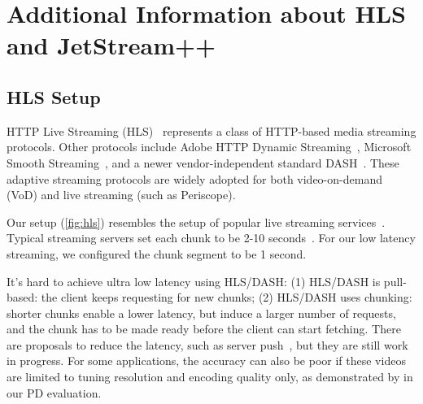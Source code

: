 


\section{Additional Information about HLS and JetStream++}
\label{sec:addit-inform-about}

\subsection{HLS Setup}
\label{appendix:hls-setup}

HTTP Live Streaming (HLS)~\cite{pantos2016http} represents a class of HTTP-based
media streaming protocols. Other protocols include Adobe HTTP Dynamic
Streaming~\cite{adobestreaming}, Microsoft Smooth
Streaming~\cite{zambelli2009iis}, and a newer vendor-independent standard
DASH~\cite{michalos2012dynamic, sodagar2011mpeg}. These adaptive streaming
protocols are widely adopted for both video-on-demand (VoD) and live streaming
(such as Periscope).

Our setup (\autoref{fig:hls}) resembles the setup of popular live streaming
services~\cite{wang2016anatomy}. Typical streaming servers set each chunk to be
2-10 seconds~\cite{mao2017neural, sun2016cs2p, wang2016anatomy}. For our low
latency streaming, we configured the chunk segment to be 1 second.

 It's hard to achieve
ultra low latency using HLS/DASH: (1) HLS/DASH is pull-based: the client keeps
requesting for new chunks; (2) HLS/DASH uses chunking: shorter chunks enable a
lower latency, but induce a larger number of requests, and the chunk has to be
made ready before the client can start fetching. There are proposals to reduce
the latency, such as server push~\cite{wei2014low}, but they are still work in
progress. For some applications, the accuracy can also be poor if these videos
are limited to tuning resolution and encoding quality only, as demonstrated by
in our PD evaluation.

